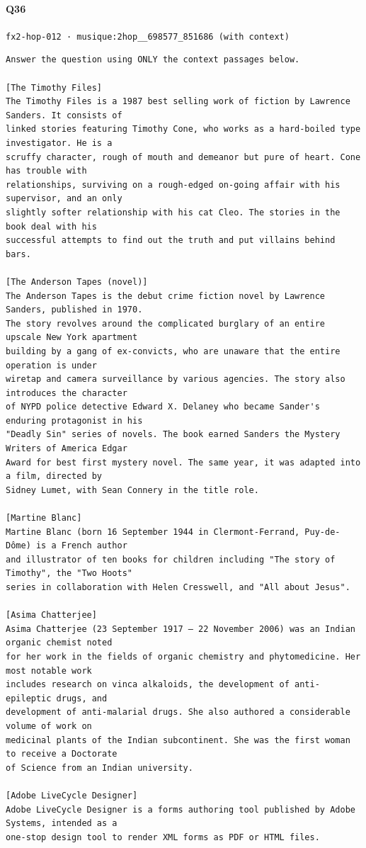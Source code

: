 \documentclass[10pt]{article}
\begin{document}
\paragraph{Q36} \texttt{fx2-hop-012  ·  musique:2hop\_\_698577\_851686 (with context)}
\begin{verbatim}
Answer the question using ONLY the context passages below.

[The Timothy Files]
The Timothy Files is a 1987 best selling work of fiction by Lawrence Sanders. It consists of
linked stories featuring Timothy Cone, who works as a hard-boiled type investigator. He is a
scruffy character, rough of mouth and demeanor but pure of heart. Cone has trouble with
relationships, surviving on a rough-edged on-going affair with his supervisor, and an only
slightly softer relationship with his cat Cleo. The stories in the book deal with his
successful attempts to find out the truth and put villains behind bars.

[The Anderson Tapes (novel)]
The Anderson Tapes is the debut crime fiction novel by Lawrence Sanders, published in 1970.
The story revolves around the complicated burglary of an entire upscale New York apartment
building by a gang of ex-convicts, who are unaware that the entire operation is under
wiretap and camera surveillance by various agencies. The story also introduces the character
of NYPD police detective Edward X. Delaney who became Sander's enduring protagonist in his
"Deadly Sin" series of novels. The book earned Sanders the Mystery Writers of America Edgar
Award for best first mystery novel. The same year, it was adapted into a film, directed by
Sidney Lumet, with Sean Connery in the title role.

[Martine Blanc]
Martine Blanc (born 16 September 1944 in Clermont-Ferrand, Puy-de-Dôme) is a French author
and illustrator of ten books for children including "The story of Timothy", the "Two Hoots"
series in collaboration with Helen Cresswell, and "All about Jesus".

[Asima Chatterjee]
Asima Chatterjee (23 September 1917 – 22 November 2006) was an Indian organic chemist noted
for her work in the fields of organic chemistry and phytomedicine. Her most notable work
includes research on vinca alkaloids, the development of anti-epileptic drugs, and
development of anti-malarial drugs. She also authored a considerable volume of work on
medicinal plants of the Indian subcontinent. She was the first woman to receive a Doctorate
of Science from an Indian university.

[Adobe LiveCycle Designer]
Adobe LiveCycle Designer is a forms authoring tool published by Adobe Systems, intended as a
one-stop design tool to render XML forms as PDF or HTML files.


\end{verbatim}
\end{document}
